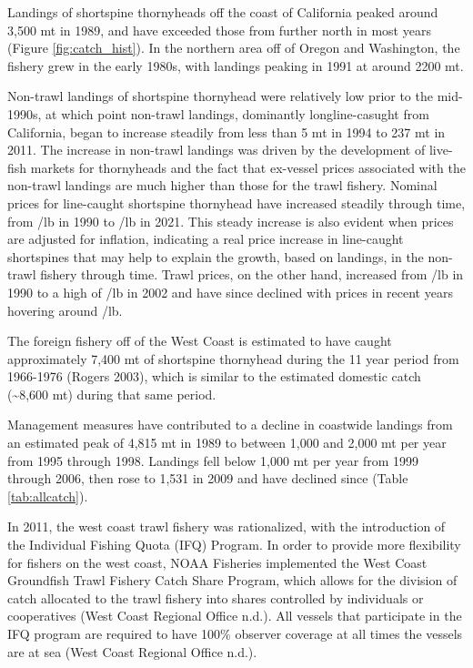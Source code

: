 \documentclass[11pt,
  english,
  letterpaper,
]{article}
\begin{document}
Landings of shortspine thornyheads off the coast of California peaked around 3,500 mt in 1989, and have exceeded those from further north in most years (Figure \ref{fig:catch_hist}). In the northern area off of Oregon and Washington, the fishery grew in the early 1980s, with landings peaking in 1991 at around 2200 mt.

Non-trawl landings of shortspine thornyhead were relatively low prior to the mid-1990s, at which point non-trawl landings, dominantly longline-casught from California, began to increase steadily from less than 5 mt in 1994 to 237 mt in 2011. The increase in non-trawl landings was driven by the development of live-fish markets for thornyheads and the fact that ex-vessel prices associated with the non-trawl landings are much higher than those for the trawl fishery. Nominal prices for line-caught shortspine thornyhead have increased steadily through time, from /lb in 1990 to /lb in 2021. This steady increase is also evident when prices are adjusted for inflation, indicating a real price increase in line-caught shortspines that may help to explain the growth, based on landings, in the non-trawl fishery through time. Trawl prices, on the other hand, increased from /lb in 1990 to a high of /lb in 2002 and have since declined with prices in recent years hovering around /lb.

The foreign fishery off of the West Coast is estimated to have caught approximately 7,400 mt of shortspine thornyhead during the 11 year period from 1966-1976 (Rogers 2003), which is similar to the estimated domestic catch (\textasciitilde8,600 mt) during that same period.

Management measures have contributed to a decline in coastwide landings from an estimated peak of 4,815 mt in 1989 to between 1,000 and 2,000 mt per year from 1995 through 1998. Landings fell below 1,000 mt per year from 1999 through 2006, then rose to 1,531 in 2009 and have declined since (Table \ref{tab:allcatch}).

In 2011, the west coast trawl fishery was rationalized, with the introduction of the Individual Fishing Quota (IFQ) Program. In order to provide more flexibility for fishers on the west coast, NOAA Fisheries implemented the West Coast Groundfish Trawl Fishery Catch Share Program, which allows for the division of catch allocated to the trawl fishery into shares controlled by individuals or cooperatives (West Coast Regional Office n.d.). All vessels that participate in the IFQ program are required to have 100\% observer coverage at all times the vessels are at sea (West Coast Regional Office n.d.).
\end{document}

